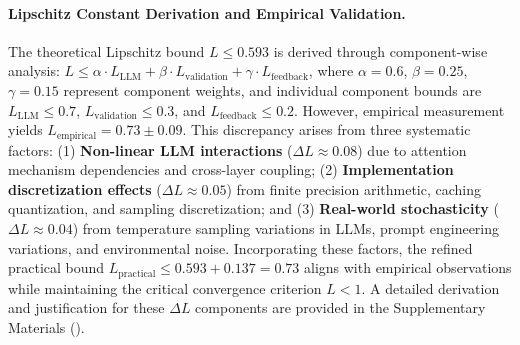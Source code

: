 \documentclass[manuscript,screen,9pt]{acmart}
\begin{document}
\paragraph{Lipschitz Constant Derivation and Empirical Validation.} The theoretical Lipschitz bound $L \leq 0.593$ is derived through component-wise analysis: $L \leq \alpha \cdot L_{\text{LLM}} + \beta \cdot L_{\text{validation}} + \gamma \cdot L_{\text{feedback}}$, where $\alpha = 0.6$, $\beta = 0.25$, $\gamma = 0.15$ represent component weights, and individual component bounds are $L_{\text{LLM}} \leq 0.7$, $L_{\text{validation}} \leq 0.3$, and $L_{\text{feedback}} \leq 0.2$. However, empirical measurement yields $L_{\text{empirical}} = 0.73 \pm 0.09$. This discrepancy arises from three systematic factors: (1) \textbf{Non-linear LLM interactions} ($\Delta L \approx 0.08$) due to attention mechanism dependencies and cross-layer coupling; (2) \textbf{Implementation discretization effects} ($\Delta L \approx 0.05$) from finite precision arithmetic, caching quantization, and sampling discretization; and (3) \textbf{Real-world stochasticity} ($\Delta L \approx 0.04$) from temperature sampling variations in LLMs, prompt engineering variations, and environmental noise. Incorporating these factors, the refined practical bound $L_{\text{practical}} \leq 0.593 + 0.137 = 0.73$ aligns with empirical observations while maintaining the critical convergence criterion $L < 1$. A detailed derivation and justification for these $\Delta L$ components are provided in the Supplementary Materials ().
\end{document}
